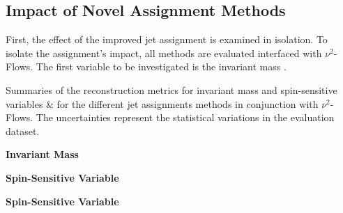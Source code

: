 \subsection{Impact of Novel Assignment Methods}
First, the effect of the improved jet assignment is examined in isolation. To isolate the assignment's impact, all methods are evaluated interfaced with $\nu^2$-Flows. The first variable to be investigated is the invariant mass \mttbar.
\begin{table}[ht]
    \centering
    \caption{Summaries of the reconstruction metrics for invariant mass  and spin-sensitive variables  \&  for the different jet assignments methods in conjunction with $\nu^2$-Flows. The uncertainties represent the statistical variations in the evaluation dataset.}
    \begin{subtable}{1.0\textwidth}
        \centering
        \caption{\textbf{Invariant Mass} \mttbar}
        \label{tab:assignment:mttbar}
        
    \end{subtable}
    \begin{subtable}{1.0\textwidth}
        \centering
        \caption{\textbf{Spin-Sensitive Variable} \chel}
        \label{tab:assignment:c_hel}
        
    \end{subtable}
    \begin{subtable}{1.0\textwidth}
    \centering
        \caption{\textbf{Spin-Sensitive Variable} \chan}
        \label{tab:assignment:c_han}
        
    \end{subtable}
\end{table}%

